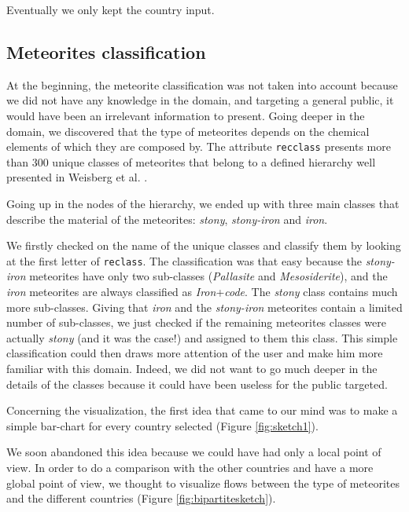 \documentclass[10pt,conference,compsocconf]{IEEEtran}
\begin{document}
Eventually we only kept the country input.

\subsection{Meteorites classification}

At the beginning, the meteorite classification was not taken into account because we did not have any knowledge in the domain, and targeting a general public, it would have been an irrelevant information to present. Going deeper in the domain, we discovered that the type of meteorites depends on the chemical elements of which they are composed by. The attribute \texttt{recclass} presents more than $300$ unique classes of meteorites that belong to a defined hierarchy well presented in Weisberg et al.  \cite{weisberg_systematics_2006}.

Going up in the nodes of the hierarchy, we ended up with three main classes that describe the material of the meteorites: \textit{stony}, \textit{stony-iron} and \textit{iron}.
 
We firstly checked on the name of the unique classes and classify them by looking at the first letter of \texttt{reclass}. The classification was that easy because the \textit{stony-iron} meteorites have only two sub-classes (\textit{Pallasite} and \textit{Mesosiderite}), and the \textit{iron} meteorites are always classified as \textit{Iron}+\textit{code}. The \textit{stony} class contains much more sub-classes. Giving that \textit{iron} and the \textit{stony-iron} meteorites contain a limited number of sub-classes, we just checked if the remaining meteorites classes were actually \textit{stony} (and it was the case!) and assigned to them this class. This simple classification could then draws more attention of the user and make him more familiar with this domain. Indeed, we did not want to go much deeper in the details of the classes because it could have been useless for the public targeted.

Concerning the visualization, the first idea that came to our mind was to make a simple bar-chart for every country selected (Figure \ref{fig:sketch1}).
 
We soon abandoned this idea because we could have had only a local point of view. In order to do a comparison with the other countries and have a more global point of view, we thought to visualize flows between the type of meteorites and the different countries (Figure \ref{fig:bipartitesketch}). 
\end{document}
